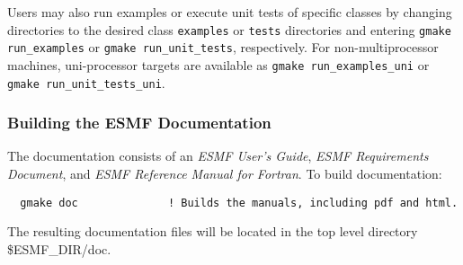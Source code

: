 Users may also run examples or execute unit tests of specific classes
by changing directories to the desired class {\tt examples} or {\tt tests} 
directories and entering {\tt gmake run\_examples} or 
{\tt gmake run\_unit\_tests}, respectively.  For non-multiprocessor machines,
uni-processor targets are available as {\tt gmake run\_examples\_uni} or
{\tt gmake run\_unit\_tests\_uni}.

\subsubsection{Building the ESMF Documentation}
\label{BuildDocumentation}

The documentation consists of an {\it ESMF User's Guide}, 
{\it ESMF Requirements Document}, and 
{\it ESMF Reference Manual for Fortran}.  
\noindent To build documentation:
\begin{verbatim}
  gmake doc              ! Builds the manuals, including pdf and html.
\end{verbatim}

\noindent The resulting documentation files will be
located in the top level directory \${ESMF\_DIR}/doc.



